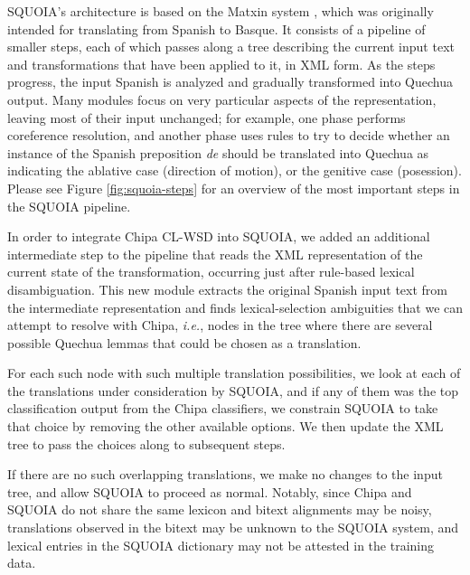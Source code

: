 SQUOIA's architecture is based on the Matxin system \cite{matxin2005}, which
was originally intended for translating from Spanish to Basque. It consists of
a pipeline of smaller steps, each of which passes along a tree describing the
current input text and transformations that have been applied to it, in XML
form. As the steps progress, the input Spanish is analyzed and gradually
transformed into Quechua output. Many modules focus on very particular aspects
of the representation, leaving most of their input unchanged; for example, one
phase performs coreference resolution, and another phase uses rules to try to
decide whether an instance of the Spanish preposition \emph{de} should be
translated into Quechua as indicating the ablative case (direction of motion),
or the genitive case (posession). Please see Figure \ref{fig:squoia-steps} for
an overview of the most important steps in the SQUOIA pipeline.

In order to integrate Chipa CL-WSD into SQUOIA, we added an additional
intermediate step to the pipeline that reads the XML representation of the
current state of the transformation, occurring just after rule-based lexical
disambiguation.
This new module extracts the original Spanish input text from the intermediate
representation and finds lexical-selection ambiguities
that we can attempt to resolve with Chipa, \emph{i.e.}, nodes in the tree where
there are several possible Quechua lemmas that could be chosen as a
translation.

For each such node with such multiple translation possibilities, we look at
each of the translations under consideration by SQUOIA, and if any of them was
the top classification output from the Chipa classifiers, we constrain SQUOIA
to take that choice by removing the other available options.
We then update the XML tree to pass the choices along to subsequent steps.

If there are no such overlapping translations, we make no changes to the input
tree, and allow SQUOIA to proceed as normal. Notably, since Chipa and SQUOIA
do not share the same lexicon and bitext alignments may be noisy, translations
observed in the bitext may be unknown to the SQUOIA system, and lexical entries
in the SQUOIA dictionary may not be attested in the training data.

